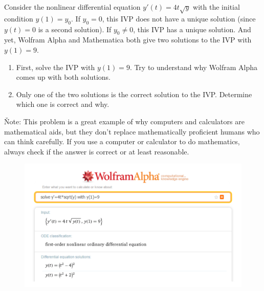 \newpage


\begin{problem}[3]
Consider the nonlinear differential equation $y'(t) = 4t\sqrt{y}$ with the initial condition $y(1) = y_0$. If $y_0 = 0$, this IVP does not have a unique solution (since $y(t) = 0$ is a second solution). If $y_0 \neq 0$, this IVP has a unique solution. And yet, Wolfram Alpha and Mathematica both give two solutions to the IVP with $y(1) = 9$.

\begin{enumerate}
\item First, solve the IVP with $y(1) = 9$. Try to understand why Wolfram Alpha comes up with both solutions.
\item Only one of the two solutions is the correct solution to the IVP. Determine which one is correct and why.
\end{enumerate}

\v{Note:} This problem is a great example of why computers and calculators are mathematical aids, but they don’t replace mathematically proficient humans who can think carefully. If you use a computer or calculator to do mathematics, always check if the answer is correct or at least reasonable.
\end{problem}
\begin{figure}[ht!]
\centering
\includegraphics[width=150mm]{5p3.jpg}
\end{figure}

\newpage


